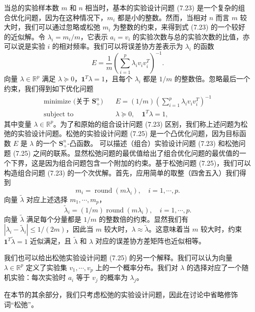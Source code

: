 \documentclass[UTF8,12pt,a4paper,fontset=fandol]{ctexart}
\begin{document}
当总的实验样本数 $m$ 和 $n$ 相当时，基本的实验设计问题 (7.23) 是一个复杂的组合优化问题，因为在这种情况下，$m_i$ 都是小的整数。然而，当相对 $n$ 而言 $m$ 较大时，我们可以通过忽略或松弛 $m_i$ 为整数的约束，来得到式 (7.23) 的一个较好的近似解。令 $\lambda_i=m_i/m$，它表示 $a_i=v_i$ 的实验次数与总的实验次数的比值，亦可以说是实验 $i$ 的相对频率。我们可以将误差协方差表示为 $\lambda_i$ 的函数
\begin{equation}
E=\frac{1}{m}\left(\sum_{i=1}^p\lambda_iv_iv_i^T\right)^{-1}.
\tag{7.24}
\end{equation}
向量 $\lambda\in\mathbb{R}^p$ 满足 $\lambda\succeq 0$，$\mathbf{1}^T\lambda=1$，且每个 $\lambda_i$ 都是 $1/m$ 的整数倍。忽略最后一个约束，我们得到如下优化问题
\begin{equation}
\begin{aligned}
\text{minimize (关于 $\mathbf{S}_+^n$)}\quad & E=(1/m)\left(\sum_{i=1}^p\lambda_iv_iv_i^T\right)^{-1}\\
\text{subject to}\quad & \lambda\succeq 0,\quad \mathbf{1}^T\lambda=1,
\end{aligned}
\tag{7.25}
\end{equation}
其中变量 $\lambda\in\mathbb{R}^p$。为了和原始的组合设计问题 (7.23) 区别，我们称上述问题为松弛的实验设计问题。松弛的实验设计问题 (7.25) 是一个凸优化问题，因为目标函数 $E$ 是 $\lambda$ 的一个 $\mathbf{S}_+^n$-凸函数。
可以描述（组合）实验设计问题 (7.23) 和松弛问题 (7.25) 之间的联系。显然松弛问题的最优值给出了组合优化问题的最优值的一个下界，这是因为组合问题包含一个附加的约束。基于松弛问题 (7.25)，我们可以构造组合问题 (7.23) 的一个次优解。首先，应用简单的取整（四舍五入）我们得到
\[
m_i=\operatorname{round}(m\lambda_i),\quad i=1,\cdots,p.
\]
向量 $\tilde{\lambda}$ 对应上述选择 $m_1,\cdots,m_p$，
\[
\tilde{\lambda}_i=(1/m)\operatorname{round}(m\lambda_i),\quad i=1,\cdots,p.
\]
向量 $\tilde{\lambda}$ 满足每个分量都是 $1/m$ 的整数倍的约束。显然我们有 $|\lambda_i-\tilde{\lambda}_i|\leq 1/(2m)$，因此当 $m$ 较大时，$\lambda\approx\tilde{\lambda}$。这意味着当 $m$ 较大时，约束 $\mathbf{1}^T\tilde{\lambda}=1$ 近似满足，且 $\tilde{\lambda}$ 和 $\lambda$ 对应的误差协方差矩阵也近似相等。

我们也可以给出松弛实验设计问题 (7.25) 的另一个解释。我们可以认为向量 $\lambda\in\mathbb{R}^p$ 定义了实验集 $v_1,\cdots,v_p$ 上的一个概率分布。我们对 $\lambda$ 的选择对应了一个随机实验：每次实验时 $a_i$ 等于 $v_j$ 的概率为 $\lambda_j$。

在本节的其余部分，我们只考虑松弛的实验设计问题，因此在讨论中省略修饰词“松弛”。
\end{document}

